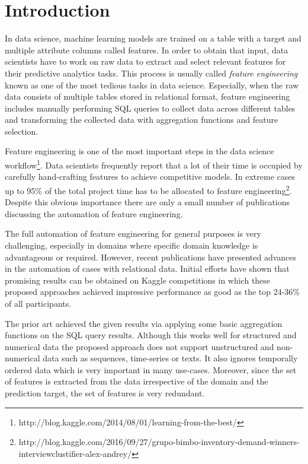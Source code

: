 \section{Introduction}
In data science, machine learning models are trained on a table with a target and multiple attribute columns called features. In order to obtain that input, data scientists have to work on raw data to extract and select relevant features for their predictive analytics tasks. This process is usually called \textit{feature engineering} known as one of the most tedious tasks in data science. Especially, when the raw data consists of multiple tables stored in relational format, feature engineering includes manually performing SQL queries to collect data across different tables and transforming the collected data with aggregation functions and feature selection. 

Feature engineering is one of the most important steps in the data science workflow\footnote{http://blog.kaggle.com/2014/08/01/learning-from-the-best/}. Data scientists frequently report that a lot of their time is occupied by carefully hand-crafting features to achieve competitive models. In extreme cases up to 95\% of the total project time has to be allocated to feature engineering\footnote{http://blog.kaggle.com/2016/09/27/grupo-bimbo-inventory-demand-winners-interviewclustifier-alex-andrey/}. Despite this obvious importance there are only a small number of publications discussing the automation of feature engineering. 

The full automation of feature engineering for general purposes is very challenging, especially in domains where specific domain knowledge is advantageous or required. However, recent publications\cite{DFS} have presented advances in the automation of cases with relational data. Initial efforts have shown that promising results can be obtained on Kaggle competitions in which these proposed approaches achieved impressive performance as good as the top 24-36\% of all participants. 

The prior art achieved the given results via applying some basic aggregation functions on the SQL query results. Although this works well for structured and numerical data the proposed approach does not support unstructured and non-numerical data such as sequences, time-series or texts. It also ignores temporally ordered data which is very important in many use-cases. Moreover, since the set of features is extracted from the data irrespective of the domain and the prediction target, the set of features is very redundant. 

